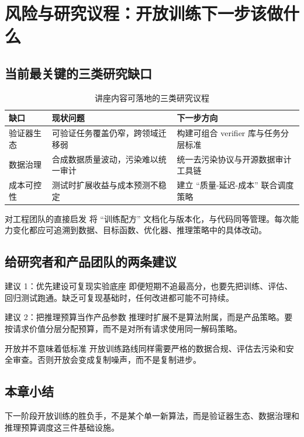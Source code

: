 \section{风险与研究议程：开放训练下一步该做什么}

\subsection{当前最关键的三类研究缺口}
\begin{table}[H]
\centering
\renewcommand{\arraystretch}{1.2}
\begin{tabular}{p{3.0cm}p{4.0cm}p{4.2cm}}
\toprule
\textbf{缺口} & \textbf{现状问题} & \textbf{下一步方向} \\
\midrule
验证器生态 & 可验证任务覆盖仍窄，跨领域迁移弱 & 构建可组合 verifier 库与任务分层标准 \\
数据治理 & 合成数据质量波动，污染难以统一审计 & 统一去污染协议与开源数据审计工具链 \\
成本可控性 & 测试时扩展收益与成本预测不稳定 & 建立 ``质量-延迟-成本'' 联合调度策略 \\
\bottomrule
\end{tabular}
\caption{讲座内容可落地的三类研究议程}
\end{table}

\begin{knowledgebox}{对工程团队的直接启发}
将 ``训练配方'' 文档化与版本化，与代码同等管理。每次能力变化都应可追溯到数据、目标函数、优化器、推理策略中的具体改动。
\end{knowledgebox}

\subsection{给研究者和产品团队的两条建议}
\begin{importantbox}{建议 1：优先建设可复现实验底座}
即便短期不追最高分，也要先把训练、评估、回归测试跑通。缺乏可复现基础时，任何改进都可能不可持续。
\end{importantbox}

\begin{importantbox}{建议 2：把推理预算当作产品参数}
推理时扩展不是算法附属，而是产品策略。要按请求价值分层分配预算，而不是对所有请求使用同一解码策略。
\end{importantbox}

\begin{warningbox}{开放并不意味着低标准}
开放训练路线同样需要严格的数据合规、评估去污染和安全审查。否则开放会变成复制噪声，而不是复制进步。
\end{warningbox}

\subsection{本章小结}
下一阶段开放训练的胜负手，不是某个单一新算法，而是验证器生态、数据治理和推理预算调度这三件基础设施。


